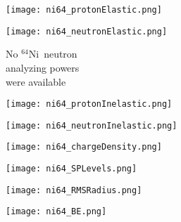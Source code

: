 \documentclass[twocolumn,secnumarabic,amssymb, nobibnotes, aps, prl,
superscriptaddress, nobalancelastpage, floatfix]{revtex4}
\newcommand{\niFour}{\ensuremath{^{64}}N\lowercase{i}}
\begin{document}
{\begin{figure*}[!htb]
    \centering
    \begin{minipage}{0.4\linewidth}
        \centering
        \texttt{[image: ni64\_protonElastic.png]}
        \label{DOM_ni64_proton_elastic}
    \end{minipage}\hspace{6pt}
    \begin{minipage}{0.4\linewidth}
        \centering
        \vspace{-10pt}
        \begin{minipage}[c]{0.5\linewidth}
            \centering
                \texttt{[image: ni64\_neutronElastic.png]}
        \end{minipage}
        \begin{minipage}[c]{0.45\linewidth}
            \centering
            No \niFour\ neutron \\
            analyzing powers \\
            were available
        \end{minipage}
        \label{DOM_ni64_neutron_elastic}
    \end{minipage}
    \centering
    \begin{minipage}{0.4\linewidth}
        \centering
        \texttt{[image: ni64\_protonInelastic.png]}
        \label{DOM_ni64_proton_inelastic}
    \end{minipage}\hspace{6pt}
    \begin{minipage}{0.4\linewidth}
        \centering
        \texttt{[image: ni64\_neutronInelastic.png]}
        \label{DOM_ni64_neutron_inelastic}
    \end{minipage}
    \centering
    \begin{minipage}{0.4\linewidth}
        \centering
        \texttt{[image: ni64\_chargeDensity.png]}
        \label{DOM_ni64_chargeDensity}
    \end{minipage}\hspace{6pt}
    \begin{minipage}{0.4\linewidth}
        \centering
        \texttt{[image: ni64\_SPLevels.png]}
        \label{DOM_ni64_SPLevels}
    \end{minipage}
    \begin{minipage}{0.4\linewidth}
        \centering
        \texttt{[image: ni64\_RMSRadius.png]}
        \label{DOM_ni64_RMSRadius}
    \end{minipage}\hspace{6pt}
    \begin{minipage}{0.4\linewidth}
        \centering
        \texttt{[image: ni64\_BE.png]}
        \label{DOM_ni64_BE}
    \end{minipage}
    \caption{\niFour: constraining experimental data and DOM fit. See introduction of
    Appendix C for description.}
    \label{DOM_ni64}
\end{figure*}

}
\end{document}
